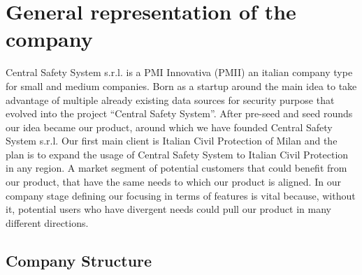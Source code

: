 \documentclass[../main.tex]{subfiles}
\begin{document}
    \chapter{General representation of the company}
    Central Safety System s.r.l. is a PMI Innovativa (PMII) an italian company type for small and medium companies.
    Born as a startup around the main idea to take advantage of multiple already existing data sources for security purpose that evolved into the project “Central Safety System”.
    After pre-seed and seed rounds our idea became our product, around which we have founded Central Safety System s.r.l.
    Our first main client is Italian Civil Protection of Milan and the plan is to expand the usage of Central Safety System to Italian Civil Protection in any region.
    A market segment of potential customers that could benefit from our product, that have the same needs to which our product is aligned.
    In our company stage defining our focusing in terms of features is vital because, without it, potential users who have divergent needs could pull our product in many different directions.

    \section{Company Structure}
\end{document}
